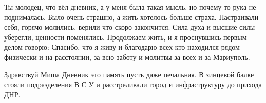  
 
 
 
 

\qqSecCmt


Ты молодец, что вёл дневник, а у меня была такая мысль, но почему то рука не
поднималась. Было очень страшно, а жить хотелось больше страха. Настраивали
себя, горячо молились, верили что скоро закончится. Сила духа и высшие силы
уберегли, ценности поменялись. Продолжаем жить, и я проснувшись первым делом
говорю: Спасибо, что я живу и благодарю всех кто находился рядом физически и на
расстоянии, за всю заботу и молитвы за всех и за Мариуполь.


Здравствуй Миша Дневник это память пусть даже печальная. В зинцевой балке стояли
подразделения В С У и расстреливали город и инфраструктуру до прихода ДНР.

